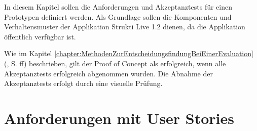 In diesem Kapitel sollen die Anforderungen und Akzeptanztests für einen
Prototypen definiert werden. Als Grundlage sollen die Komponenten und
Verhaltensmuster der Applikation Strukti Live 1.2 dienen, da die Applikation
öffentlich verfügbar ist.

Wie im Kapitel \ref{chapter:MethodenZurEntscheidungsfindungBeiEinerEvaluation}
(, S.
\pageref{chapter:MethodenZurEntscheidungsfindungBeiEinerEvaluation}ff)
beschrieben, gilt der Proof of Concept als erfolgreich, wenn alle
Akzeptanztests erfolgreich abgenommen wurden. Die Abnahme der Akzeptanztests
erfolgt durch eine visuelle Prüfung.

\section{Anforderungen mit User Stories}

